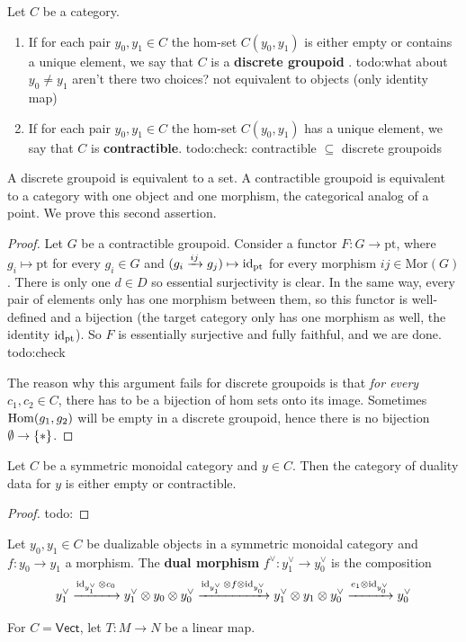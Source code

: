 \begin{definition}[]
    Let $C$ be a category.
    \begin{enumerate}[label=(\roman*)]
    \setlength\itemsep{-.2em}
\item If for each pair $y_0,y_1 \in C$ the hom-set $C(y_0,y_1)$ is either empty or contains a unique element, we say that $C$ is a \textbf{discrete groupoid} . {\color{red}todo:what about $y_0\neq y_1$ aren't there two choices? not equivalent to objects (only identity map)} 
\item If for each pair $y_0,y_1 \in C $ the hom-set $C(y_0,y_1)$ has a unique element, we say that $C$ is \textbf{contractible}. {\color{red}todo:check: contractible $\subseteq $ discrete groupoids}   

    \end{enumerate}
\end{definition}
A discrete groupoid is equivalent to a set. A contractible groupoid is equivalent to a category with one object and one morphism, the categorical analog of a point. We prove this second assertion.
\begin{proof}
    Let $G$ be a contractible groupoid. Consider a functor $F \colon G \to \mathrm{pt}$, where $g_i  \mapsto  \mathrm{pt}$ for every $g_i  \in G$ and $(g_i \xrightarrow{ij}g_j ) \mapsto \operatorname{id}_{\mathrm{pt}} $ for every morphism $ij \in \mathrm{Mor}(G)$. There is only one $d \in D$ so essential surjectivity is clear. In the same way, every pair of elements only has one morphism between them, so this functor is well-defined and a bijection (the target category only has one morphism as well, the identity $\operatorname{id}_{\mathrm{pt}}$). So $F$ is essentially surjective and fully faithful, and we are done. {\color{red}todo:check} 

    The reason why this argument fails for discrete groupoids is that \emph{for every} $c_1,c_2 \in C$, there has to be a bijection of hom sets onto its image. Sometimes $\operatorname{Hom}(g_1,g_2)$ will be empty in a discrete groupoid, hence there is no bijection $\emptyset \to \{*\} $.
\end{proof}
\begin{prop}
    Let $C$ be a symmetric monoidal category and $y \in C$. Then the category of duality data for $y$ is either empty or contractible.
\end{prop}
\begin{proof}
    {\color{red}todo:} 
\end{proof}
\begin{definition}[]
    Let $y_0,y_1 \in C$ be dualizable objects in a symmetric monoidal category and $f \colon y_0 \to y_1$ a morphism. The \textbf{dual morphism}  $f ^{\vee} \colon  y_1 ^{\vee} \to y_0^{\vee}$ is the composition \[
    y_1 ^{\vee}\xrightarrow{\operatorname{id} _{y_1^{\vee}}\otimes c_0} y_1 ^{\vee}\otimes y_0 \otimes y_0 ^{\vee}\xrightarrow{\operatorname{id}_{y_1^{\vee}}\otimes f \otimes \operatorname{id}_{y_0 ^{\vee}} } y_1 ^{\vee }\otimes y_1 \otimes y_0 ^{\vee}\xrightarrow{e_1 \otimes \operatorname{id} _{y_0 ^{\vee}}} y_0^{\vee}
    \] 
\end{definition}
\begin{ex}
   For $C= \mathsf{Vect} $, let $T \colon M \to N$ be a linear map.
\end{ex}
